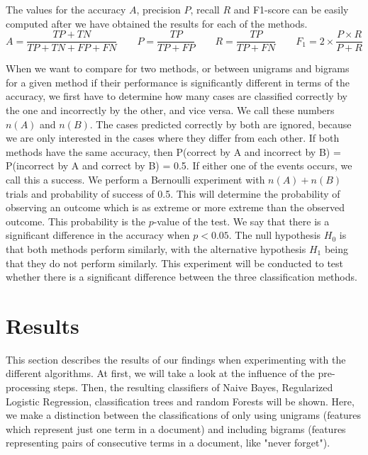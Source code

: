 \documentclass[a4paper,11pt]{article}
\begin{document}
The values for the accuracy $A$, precision $P$, recall $R$ and F1-score can be easily computed after we have obtained the results for each of the methods.
\[
A = \frac{TP + TN}{TP + TN + FP + FN}
\qquad
P = \frac{TP}{TP+FP}
\qquad
R = \frac{TP}{TP+FN}
\qquad
F_1 = 2\times\frac{P \times R}{P+R}
\]

When we want to compare for two methods, or between unigrams and bigrams for a given method if their performance is significantly different in terms of the accuracy, we first have to determine how many cases are classified correctly by the one and incorrectly by the other, and vice versa. We call these numbers $n(A)$ and $n(B)$. The cases predicted correctly by both are ignored, because we are only interested in the cases where they differ from each other. If both methods have the same accuracy, then P(correct by A and incorrect by B) = P(incorrect by A and correct by B) = 0.5. If either one of the events occurs, we call this a success. We perform a Bernoulli experiment with $n(A)+n(B)$ trials and probability of success of 0.5. This will determine the probability of observing an outcome which is as extreme or more extreme than the observed outcome. This probability is the $p$-value of the test. We say that there is a significant difference in the accuracy when $p<0.05$. The null hypothesis $H_0$ is that both methods perform similarly, with the alternative hypothesis $H_1$ being that they do not perform similarly. This experiment will be conducted to test whether there is a significant difference between the three classification methods.

\section{Results}
This section describes the results of our findings when experimenting with the different algorithms. At first, we will take a look at the influence of the pre-processing steps. Then, the resulting classifiers of Naive Bayes, Regularized Logistic Regression, classification trees and random Forests will be shown. Here, we make a distinction between the classifications of only using unigrams (features which represent just one term in a document) and including bigrams (features representing pairs of consecutive terms in a document, like "never forget").
\end{document}
